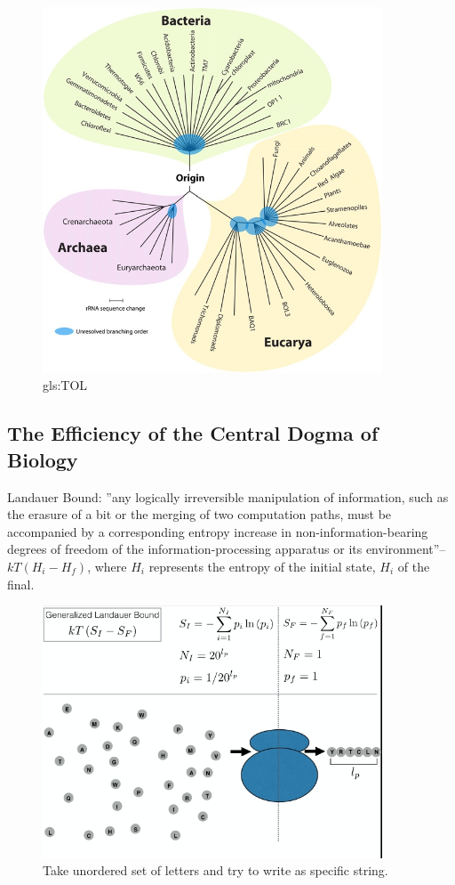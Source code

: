 \documentclass[]{article}
\begin{document}
\begin{figure}[H]
	\caption{\gls{gls:TOL}}\label{fig:TOL} 
	\includegraphics[width=0.9\textwidth]{TOL}
\end{figure}



\subsection{The Efficiency of the Central Dogma of Biology}

Landauer Bound: ''any logically irreversible manipulation of information, such as the erasure of a bit or the merging of two computation paths, must be accompanied by a corresponding entropy increase in non-information-bearing degrees of freedom of the information-processing apparatus or its environment''--$kT(H_i - H_f)$, where $H_i$ represents the entropy of the initial state, $H_i$ of the final\cite{wiki:landauer}\cite{bennett2003notes}\cite{landauer1961irreversibility}. 

\begin{figure}[H]
	\caption{Take unordered set of letters and try to write as specific string.}\label{fig:LandauerRibosome} 
	\includegraphics[width=0.9\textwidth]{LandauerRibosome}
\end{figure}
\end{document}
